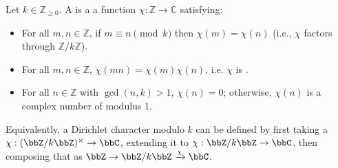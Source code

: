 \begin{definition} \label{definition:dirichlet_character_modulo_a_nonnegative_integer}
Let $k \in \mathbb{Z}_{\geq 0}$. A  is a a function $\chi : \mathbb{Z} \to \mathbb{C}$ satisfying:
\begin{itemize}
   \item For all $m, n \in \mathbb{Z}$, if $m \equiv n \pmod{k}$ then $\chi(m) = \chi(n)$ (i.e., $\chi$ factors through $\mathbb{Z}/k\mathbb{Z}$).
   \item For all $m, n \in \mathbb{Z}$, $\chi(mn) = \chi(m)\chi(n)$, i.e. $\chi$ is .
   \item For all $n \in \mathbb{Z}$ with $\gcd(n,k) > 1$, $\chi(n) = 0$; otherwise, $\chi(n)$ is a complex number of modulus $1$.
\end{itemize}
Equivalently, a Dirichlet character modulo $k$ can be defined by first taking a  $\chi: (\bbZ / k\bbZ)^\times \to \bbC$, extending it to $\chi: \bbZ / k \bbZ \to \bbC$, then composing that as $\bbZ \to \bbZ / k \bbZ \xrightarrow{\chi} \bbC$.
\end{definition}
